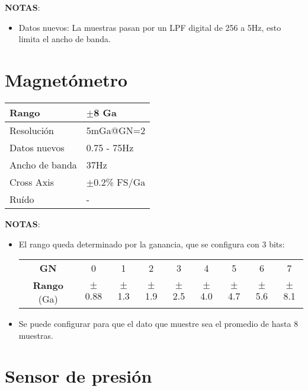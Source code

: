 \documentclass[main]{subfiles}
\begin{document}
\textbf{NOTAS}:
\begin{itemize}
\item Datos nuevos: La muestras pasan por un LPF digital de 256 a 5Hz, esto limita el ancho de banda.
\end{itemize}

\section{Magnet\'ometro}

\begin{table}[H]
\begin{center}
\begin{tabular}{|p{3cm}|p{6.5cm}|}
\hline
Rango & $\pm$8 Ga\\
\hline
Resoluci\'on &  5mGa@GN=2\\
\hline
Datos nuevos &  0.75 - 75Hz\\
\hline
Ancho de banda &  37Hz\\
\hline
Cross Axis & $\pm$0.2\% FS/Ga \\
\hline
Ru\'ido & - \\
\hline
\end{tabular}
\label{tab:magn}
\end{center}
\end{table}

\newpage
\textbf{NOTAS}:
\begin{itemize}
\item El rango queda determinado por la ganancia, que se configura con 3 bits:
\begin{table}[H]
\begin{center}
\begin{tabular}{|c|c|c|c|c|c|c|c|c|}
\hline
\textbf{GN} & 0 & 1 & 2 & 3 & 4 & 5 & 6 & 7 \\
\textbf{Rango} (Ga)& $\pm$0.88 & $\pm$1.3 & $\pm$1.9 & $\pm$2.5 & $\pm$4.0 & $\pm$4.7 & $\pm$5.6 & $\pm$8.1 \\
\hline
\end{tabular}
\label{tab:magn-gain}
\end{center}
\end{table}
\item Se puede configurar para que el dato que muestre sea el promedio de hasta 8 muestras.
\end{itemize}

\section{Sensor de presi\'on}
\end{document}

